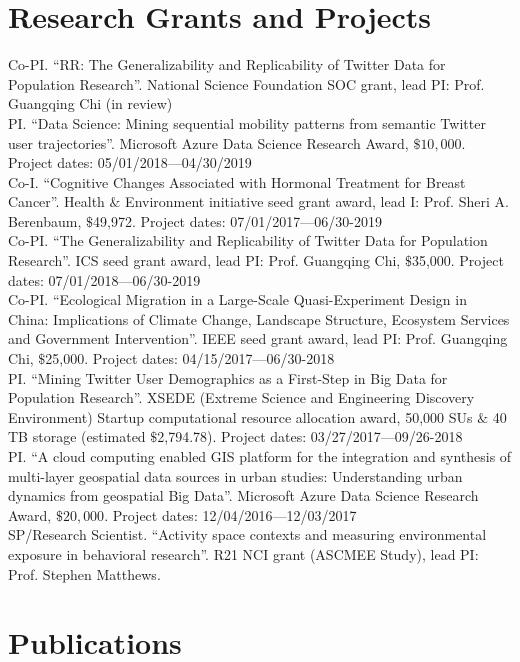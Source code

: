 \documentclass[11pt, a4paper]{article}
\newcommand{\years}[1]{\marginnote{\scriptsize #1}}
\begin{document}
\section*{Research Grants and Projects}
Co-PI. ``RR: The Generalizability and Replicability of Twitter Data for Population Research''. National Science Foundation SOC grant, lead PI: Prof. Guangqing Chi (in review)\\
PI. ``Data Science: Mining sequential mobility patterns from semantic Twitter user trajectories''. Microsoft Azure Data Science Research Award, $\$10,000$. Project dates: 05/01/2018—04/30/2019\\
Co-I. ``Cognitive Changes Associated with Hormonal Treatment for Breast Cancer''. Health $\&$ Environment initiative seed grant award, lead I: Prof. Sheri A. Berenbaum, $\$$49,972. Project dates: 07/01/2017—06/30-2019\\
Co-PI. ``The Generalizability and Replicability of Twitter Data for Population Research''. ICS seed grant award, lead PI: Prof. Guangqing Chi, $\$$35,000. Project dates: 07/01/2018—06/30-2019\\
Co-PI. ``Ecological Migration in a Large-Scale Quasi-Experiment Design in China: Implications of Climate Change, Landscape Structure, Ecosystem Services and Government Intervention''. IEEE seed grant award, lead PI: Prof. Guangqing Chi, $\$$25,000. Project dates: 04/15/2017—06/30-2018\\
PI. ``Mining Twitter User Demographics as a First-Step in Big Data for Population Research''. XSEDE (Extreme Science and Engineering Discovery Environment) Startup computational resource allocation award, 50,000 SUs $\&$ 40 TB storage (estimated $\$$2,794.78). Project dates: 03/27/2017—09/26-2018\\
PI. ``A cloud computing enabled GIS platform for the integration and synthesis of multi-layer geospatial data sources in urban studies: Understanding urban dynamics from geospatial Big Data''. Microsoft Azure Data Science Research Award, $\$20,000$. Project dates: 12/04/2016—12/03/2017\\
SP/Research Scientist. ``Activity space contexts and measuring environmental exposure in behavioral research''. R21 NCI grant (ASCMEE Study), lead PI: Prof. Stephen Matthews.

\section*{Publications}
\end{document}
